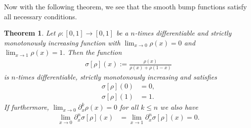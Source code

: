 \documentclass{article}
\newtheorem{theorem}{Theorem}
\begin{document}
Now with the following theorem, we see that the smooth bump functions satisfy all necessary conditions.
\begin{theorem}
\label{thm:smooth-sigmoid}
Let $\rho \colon [0,1] \rightarrow [0, 1]$ be a $n$-times differentiable and strictly monotonously increasing function with $\lim_{x \rightarrow 0} \rho(x)=0$ and $\lim_{x \rightarrow 1} \rho(x)=1$. Then the function
\begin{align}
    \sigma[\rho](x) := \frac{\rho(x)}{\rho(x) + \rho(1-x)}
\end{align}
is $n$-times differentiable, strictly monotonously increasing and satisfies
\begin{align}
    \sigma[\rho](0) &= 0, \\
    \sigma[\rho](1) &= 1.
\end{align}
If furthermore, $\lim_{x \rightarrow 0} \partial_{x}^{k} \rho(x) = 0$ for all $k \leq n$ we also have
\begin{align}
    \lim_{x \rightarrow 0} \partial^{n}_{x} \sigma[\rho](x) &= \lim_{x \rightarrow 1}  \partial^{n}_{x}  \sigma[\rho](x) = 0.
\end{align}
\end{theorem}
\end{document}
